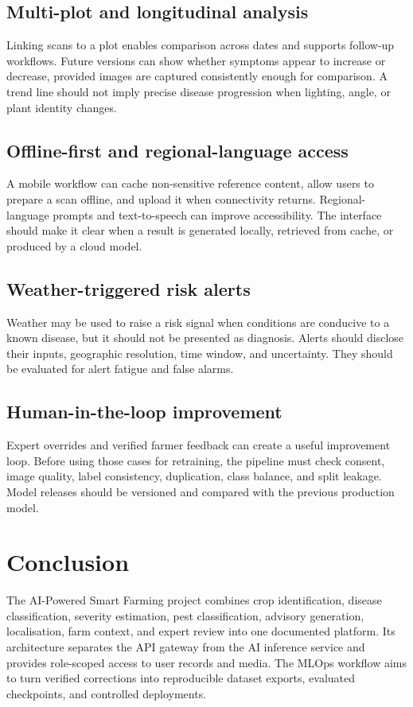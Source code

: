 \documentclass[12pt,a4paper,oneside,openany]{report}
\begin{document}
\section{Multi-plot and longitudinal analysis}
Linking scans to a plot enables comparison across dates and supports follow-up workflows. Future versions can show whether symptoms appear to increase or decrease, provided images are captured consistently enough for comparison. A trend line should not imply precise disease progression when lighting, angle, or plant identity changes.

\section{Offline-first and regional-language access}
A mobile workflow can cache non-sensitive reference content, allow users to prepare a scan offline, and upload it when connectivity returns. Regional-language prompts and text-to-speech can improve accessibility. The interface should make it clear when a result is generated locally, retrieved from cache, or produced by a cloud model.

\section{Weather-triggered risk alerts}
Weather may be used to raise a risk signal when conditions are conducive to a known disease, but it should not be presented as diagnosis. Alerts should disclose their inputs, geographic resolution, time window, and uncertainty. They should be evaluated for alert fatigue and false alarms.

\section{Human-in-the-loop improvement}
Expert overrides and verified farmer feedback can create a useful improvement loop. Before using those cases for retraining, the pipeline must check consent, image quality, label consistency, duplication, class balance, and split leakage. Model releases should be versioned and compared with the previous production model.

\chapter{Conclusion}
The AI-Powered Smart Farming project combines crop identification, disease classification, severity estimation, pest classification, advisory generation, localisation, farm context, and expert review into one documented platform. Its architecture separates the API gateway from the AI inference service and provides role-scoped access to user records and media. The MLOps workflow aims to turn verified corrections into reproducible dataset exports, evaluated checkpoints, and controlled deployments.
\end{document}
